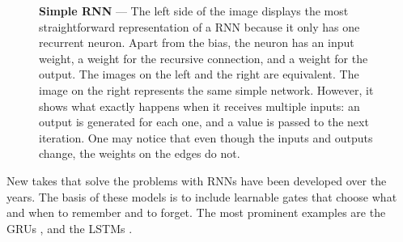 \begin{figure}[!ht]
    \centering
    \caption[Simple recurrent neural network]{\textbf{Simple \acl{RNN}} --- The left side of the image displays the most straightforward representation of a \ac{RNN} because it only has one recurrent neuron. Apart from the bias, the neuron has an input weight, a weight for the recursive connection, and a weight for the output. The images on the left and the right are equivalent. The image on the right represents the same simple network. However, it shows what exactly happens when it receives multiple inputs: an output is generated for each one, and a value is passed to the next iteration. One may notice that even though the inputs and outputs change, the weights on the edges do not.}
    \label{fig:rnn}
\end{figure}

New takes that solve the problems with \acp{RNN} have been developed over the years. The basis of these models is to include learnable gates that choose what and when to remember and to forget. The most prominent examples are the \Acfp{GRU} \cite{cho_properties_2014}, and the \Acfp{LSTM} \cite{hochreiter_long_1997}.